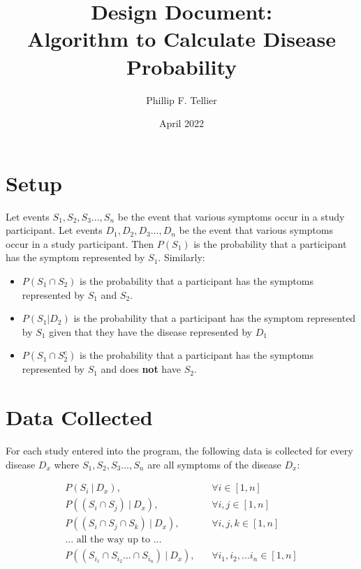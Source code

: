 \documentclass{article}
\title{\textbf{Design Document}:\\ Algorithm to Calculate Disease Probability}
\author{Phillip F. Tellier }
\date{April 2022}
\begin{document}
\maketitle

\section{Setup}

Let events $S_{1}, S_{2}, S_{3} \ldots, S_{n}$ be the event that various symptoms occur in a study participant. Let events $D_{1}, D_{2}, D_{3} \ldots, D_{n}$ be the event that various symptoms occur in a study participant. Then $P(S_{1})$ is the probability that a participant has the symptom represented by $S_{1}$. Similarly:\medskip
\begin{itemize}
    \item $P\left(S_{1} \cap S_{2}\right)$ is the probability that a participant has the symptoms represented by $S_{1}$ and $S_{2}$.
    \item $P\left(S_{1} | D_{2}\right)$ is the probability that a participant has the symptom represented by $S_{1}$ given that they have the disease represented by $D_{1}$
    \item $P\left(S_{1} \cap S_{2}^{c} \right)$ is the probability that a participant has the symptoms represented by $S_{1}$ and does \textbf{not} have $S_{2}$.
\end{itemize}


\section{Data Collected}

For each study entered into the program, the following data is collected for every disease $D_{x}$ where $S_{1}, S_{2}, S_{3} \ldots, S_{n}$ are all symptoms of the disease $D_{x}$:
\medskip

\begin{equation} \label{eq1}
\begin{split}
P\left(S_{i}~|~D_{x}\right), & ~~~~\forall i \in[1, n]\\
P\left((S_{i} \cap S_{j})~|~D_{x}\right), & ~~~~\forall i, j \in[1, n]\\
P\left((S_{i} \cap S_{j} \cap S_{k}) ~|~D_{x}\right), & ~~~~\forall i, j, k \in[1, n]\\
\text{... all the way up to ...}\\
P\left((S_{i_{1}} \cap S_{i_{2}} \ldots \cap S_{i_{n}}) ~|~D_{x}\right), & ~~~~\forall i_{1}, i_{2}, \ldots i_{n} \in[1, n]\\
\end{split}
\end{equation}
\end{document}
